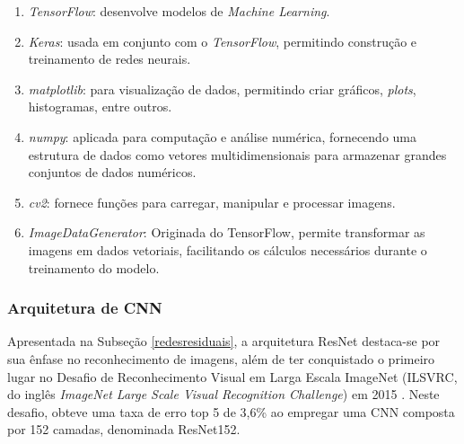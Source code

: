 \begin{enumerate}[label=\alph*)]
    \item \textit{TensorFlow}: desenvolve modelos de \textit{Machine Learning}.
    
    \item \textit{Keras}: usada em conjunto com o \textit{TensorFlow}, permitindo construção e treinamento de redes neurais.
    
        
    \item \textit{matplotlib}: para visualização de dados, permitindo criar gráficos, \textit{plots}, histogramas, entre outros.
    
    \item \textit{numpy}: aplicada para computação e análise numérica, fornecendo uma estrutura de dados como vetores multidimensionais para armazenar grandes conjuntos de dados numéricos.


    \item \textit{cv2}: fornece funções para carregar, manipular e processar imagens.




     \item \textit{ImageDataGenerator}: Originada do TensorFlow, permite transformar as imagens em dados vetoriais, facilitando os cálculos necessários durante o treinamento do modelo.
\end{enumerate}

\subsubsection{\esp Arquitetura de CNN} \label{arqCNN}

Apresentada na Subseção \ref{redesresiduais}, a arquitetura ResNet destaca-se por sua ênfase no reconhecimento de imagens, além de ter conquistado o primeiro lugar no Desafio de Reconhecimento Visual em Larga Escala ImageNet (ILSVRC, do inglês \textit{ImageNet Large Scale Visual Recognition Challenge}) em 2015 \cite{resnet50analisys}. Neste desafio, obteve uma taxa de erro top 5 de 3,6\% ao empregar uma CNN composta por 152 camadas, denominada ResNet152.


